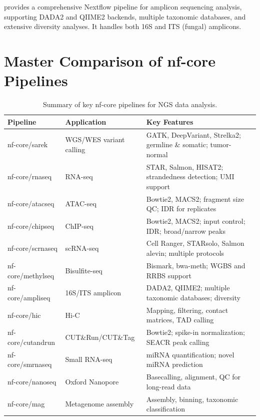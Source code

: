 \begin{tipbox}[title={Production Alternative: nf-core/ampliseq}]
 provides a comprehensive Nextflow pipeline for amplicon sequencing analysis, supporting DADA2 and QIIME2 backends, multiple taxonomic databases, and extensive diversity analyses. It handles both 16S and ITS (fungal) amplicons.
\end{tipbox}

\section{Master Comparison of nf-core Pipelines}
\label{sec:wf:nfcore-table}

\begin{table}[htbp]
\centering
\caption{Summary of key nf-core pipelines for NGS data analysis.}
\label{tab:nfcore-pipelines}
\small
\renewcommand{\arraystretch}{1.25}
\begin{tabularx}{\textwidth}{@{}l l X@{}}
\toprule
\textbf{Pipeline} & \textbf{Application} & \textbf{Key Features} \\
\midrule
nf-core/sarek & WGS/WES variant calling & GATK, DeepVariant, Strelka2; germline \& somatic; tumor-normal \\
nf-core/rnaseq & RNA-seq & STAR, Salmon, HISAT2; strandedness detection; UMI support \\
nf-core/atacseq & ATAC-seq & Bowtie2, MACS2; fragment size QC; IDR for replicates \\
nf-core/chipseq & ChIP-seq & Bowtie2, MACS2; input control; IDR; broad/narrow peaks \\
nf-core/scrnaseq & scRNA-seq & Cell Ranger, STARsolo, Salmon alevin; multiple protocols \\
nf-core/methylseq & Bisulfite-seq & Bismark, bwa-meth; WGBS and RRBS support \\
nf-core/ampliseq & 16S/ITS amplicon & DADA2, QIIME2; multiple taxonomic databases; diversity \\
nf-core/hic & Hi-C & Mapping, filtering, contact matrices, TAD calling \\
nf-core/cutandrun & CUT\&Run/CUT\&Tag & Bowtie2; spike-in normalization; SEACR peak calling \\
nf-core/smrnaseq & Small RNA-seq & miRNA quantification; novel miRNA prediction \\
nf-core/nanoseq & Oxford Nanopore & Basecalling, alignment, QC for long-read data \\
nf-core/mag & Metagenome assembly & Assembly, binning, taxonomic classification \\
\bottomrule
\end{tabularx}
\end{table}

